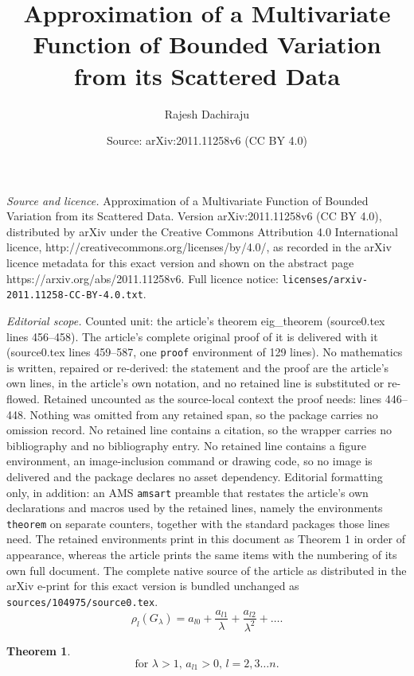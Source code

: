\documentclass[10pt,a4paper]{amsart}
\title{Approximation of a Multivariate Function of Bounded Variation from its Scattered Data}
\author{Rajesh Dachiraju}
\date{Source: arXiv:2011.11258v6 (CC BY 4.0)}
\newtheorem{theorem}{Theorem}
\begin{document}
\maketitle

\noindent\emph{Source and licence.} Approximation of a Multivariate Function of Bounded Variation from its Scattered Data. Version arXiv:2011.11258v6 (CC BY 4.0), distributed by arXiv under the Creative Commons Attribution 4.0 International licence, http://creativecommons.org/licenses/by/4.0/, as recorded in the arXiv licence metadata for this exact version and shown on the abstract page https://arxiv.org/abs/2011.11258v6. Full licence notice: \texttt{licenses/arxiv-2011.11258-CC-BY-4.0.txt}.\par\smallskip

\noindent\textit{Editorial scope.} Counted unit: the article's theorem eig\_theorem (source0.tex lines 456--458). The article's complete original proof of it is delivered with it (source0.tex lines 459--587, one \texttt{proof} environment of 129 lines). No mathematics is written, repaired or re-derived: the statement and the proof are the article's own lines, in the article's own notation, and no retained line is substituted or re-flowed.  Retained uncounted as the source-local context the proof needs: lines 446--448.  Nothing was omitted from any retained span, so the package carries no omission record.  No retained line contains a citation, so the wrapper carries no bibliography and no bibliography entry.  No retained line contains a figure environment, an image-inclusion command or drawing code, so no image is delivered and the package declares no asset dependency.  Editorial formatting only, in addition: an AMS \texttt{amsart} preamble that restates the article's own declarations and macros used by the retained lines, namely the environments \texttt{theorem} on separate counters, together with the standard packages those lines need.  The retained environments print in this document as Theorem 1 in order of appearance, whereas the article prints the same items with the numbering of its own full document.  The complete native source of the article as distributed in the arXiv e-print for this exact version is bundled unchanged as \texttt{sources/104975/source0.tex}.
\begin{equation}\label{eig_G}
\rho_l(G_{\lambda}) = a_{l0} + \frac{a_{l1}}{\lambda} +\frac{a_{l2}}{\lambda^2}+\ldots.
\end{equation}

\begin{theorem}\label{eig_theorem}
 $$\mbox{for    }\lambda>1\mbox{,          } a_{l1} > 0 \mbox{,         } l= 2,3\ldots n.$$ 
\end{theorem}
\end{document}
